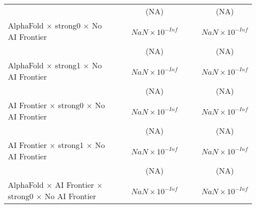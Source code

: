 \begin{tabular}{lcccccc}
                                                                              &                        &                        & (NA)                   &                        &                        & (NA)\\   
   AlphaFold $\times$ strong0 $\times$ No AI Frontier                         &                        &                        & $NaN\times 10^{-Inf}$  &                        &                        & $NaN\times 10^{-Inf}$\\    
                                                                              &                        &                        & (NA)                   &                        &                        & (NA)\\   
   AlphaFold $\times$ strong1 $\times$ No AI Frontier                         &                        &                        & $NaN\times 10^{-Inf}$  &                        &                        & $NaN\times 10^{-Inf}$\\    
                                                                              &                        &                        & (NA)                   &                        &                        & (NA)\\   
   AI Frontier $\times$ strong0 $\times$ No AI Frontier                       &                        &                        & $NaN\times 10^{-Inf}$  &                        &                        & $NaN\times 10^{-Inf}$\\    
                                                                              &                        &                        & (NA)                   &                        &                        & (NA)\\   
   AI Frontier $\times$ strong1 $\times$ No AI Frontier                       &                        &                        & $NaN\times 10^{-Inf}$  &                        &                        & $NaN\times 10^{-Inf}$\\    
                                                                              &                        &                        & (NA)                   &                        &                        & (NA)\\   
   AlphaFold $\times$ AI Frontier $\times$ strong0 $\times$ No AI Frontier    &                        &                        & $NaN\times 10^{-Inf}$  &                        &                        & $NaN\times 10^{-Inf}$\\    

\end{tabular}
